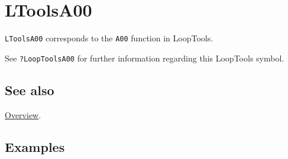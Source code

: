 \documentclass[../FeynHelpersManual.tex]{subfiles}
\begin{document}
\hypertarget{ltoolsa00}{
\section{LToolsA00}\label{ltoolsa00}}

\texttt{LToolsA00} corresponds to the \texttt{A00} function in
LoopTools.

See \texttt{?LoopTools\textasciigrave A00} for further information
regarding this LoopTools symbol.

\subsection{See also}

\hyperlink{toc}{Overview}.

\subsection{Examples}
\end{document}
